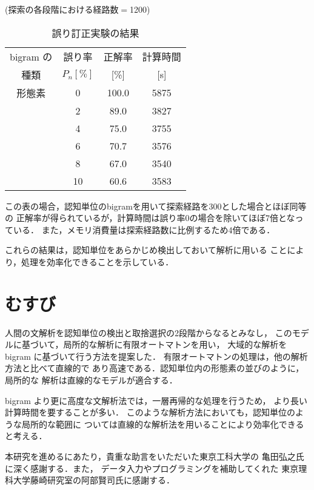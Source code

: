 \begin{table}[bth]
\caption{誤り訂正実験の結果}\label{hyo2}
\begin{center}
{\small (探索の各段階における経路数$=$1200)}\\[3mm]
\begin{tabular}{c|c|cc} \hline
bigram の & 誤り率 & 正解率 & 計算時間 \\
種類 & $P_n[\%]$ & [\%] & [s]\\ \hline
形態素 & 0 & 100.0 & 5875 \\
 & 2 & 89.0 & 3827 \\
 & 4 & 75.0 & 3755 \\
 & 6 & 70.7 & 3576 \\
 & 8 & 67.0 & 3540 \\
 & 10 & 60.6 & 3583 \\ \hline
\end{tabular}
\end{center}
\end{table}

この表の場合，認知単位のbigramを用いて探索経路を300とした場合とほぼ同等の
正解率が得られているが，計算時間は誤り率0の場合を除いてほぼ7倍となっている．
また，メモリ消費量は探索経路数に比例するため4倍である．



これらの結果は，認知単位をあらかじめ検出しておいて解析に用いる
ことにより，処理を効率化できることを示している．

\section{むすび}

人間の文解析を認知単位の検出と取捨選択の2段階からなるとみなし，
このモデルに基づいて，局所的な解析に有限オートマトンを用い，
大域的な解析を bigram に基づいて行う方法を提案した．
有限オートマトンの処理は，他の解析方法と比べて直線的で
あり高速である．認知単位内の形態素の並びのように，局所的な
解析は直線的なモデルが適合する．

bigram より更に高度な文解析法では，一層再帰的な処理を行うため，
より長い計算時間を要することが多い．
このような解析方法においても，認知単位のような局所的な範囲に
ついては直線的な解析法を用いることにより効率化できると考える．

\vfill

\acknowledgment

本研究を進めるにあたり，貴重な助言をいただいた東京工科大学の
亀田弘之氏に深く感謝する．また，
データ入力やプログラミングを補助してくれた
東京理科大学藤崎研究室の阿部賢司氏に感謝する．

